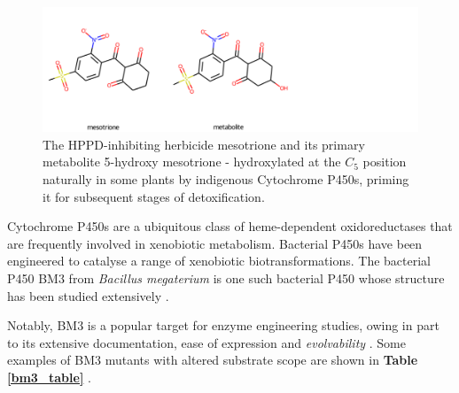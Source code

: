 \documentclass{article}
\begin{document}
\par
\begin{figure}
         \begin{center}
         \caption{\label{mesotrione} The HPPD-inhibiting herbicide mesotrione and its primary metabolite 5-hydroxy mesotrione - hydroxylated at the $C_5$ position naturally in some plants by indigenous Cytochrome P450s, priming it for subsequent stages of detoxification.}
         \includegraphics[width = \textwidth]{img/mesotrione+metabolite.png}
         \end{center}
 \end{figure}

 \par

Cytochrome P450s are a ubiquitous class of heme-dependent oxidoreductases that are frequently involved in xenobiotic metabolism. %
Bacterial P450s have been engineered to catalyse a range of xenobiotic biotransformations. The bacterial P450 BM3 from \textit{Bacillus megaterium} is one such bacterial P450 whose structure has been studied extensively \cite{munro2002p450}. 


Notably, BM3 is a popular target for enzyme engineering studies, owing in part to its extensive documentation, ease of expression and \textit{evolvability} \cite{bloom2006protein}.
Some examples of BM3 mutants with altered substrate scope are shown in \textbf{Table \ref{bm3_table}} \cite{wong}.
\par
\end{document}
